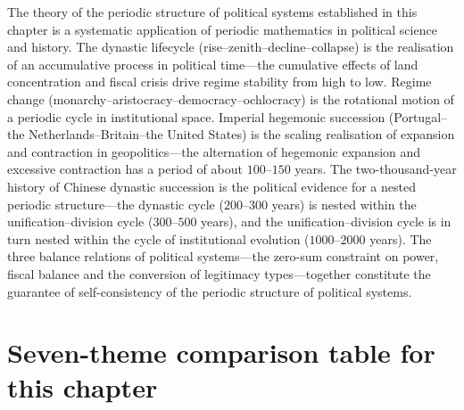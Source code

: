 \begin{remark}
The theory of the periodic structure of political systems established in this chapter is a systematic application of periodic mathematics in political science and history. The dynastic lifecycle (rise--zenith--decline--collapse) is the realisation of an accumulative process in political time---the cumulative effects of land concentration and fiscal crisis drive regime stability from high to low. Regime change (monarchy--aristocracy--democracy--ochlocracy) is the rotational motion of a periodic cycle in institutional space. Imperial hegemonic succession (Portugal--the Netherlands--Britain--the United States) is the scaling realisation of expansion and contraction in geopolitics---the alternation of hegemonic expansion and excessive contraction has a period of about $100$--$150$ years. The two-thousand-year history of Chinese dynastic succession is the political evidence for a nested periodic structure---the dynastic cycle ($200$--$300$ years) is nested within the unification--division cycle ($300$--$500$ years), and the unification--division cycle is in turn nested within the cycle of institutional evolution ($1000$--$2000$ years). The three balance relations of political systems---the zero-sum constraint on power, fiscal balance and the conversion of legitimacy types---together constitute the guarantee of self-consistency of the periodic structure of political systems.
\end{remark}

\section*{Seven-theme comparison table for this chapter}

